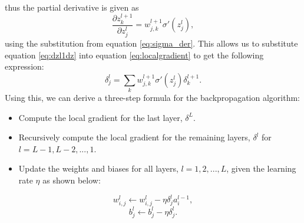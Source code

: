 thus the partial derivative is given as 
\begin{equation}
    \label{eq:dzl1dz}
    \frac{\partial z_k^{l+1}}{\partial z_j^l} = w_{j,k}^{l+1}\sigma'(z_j^l), 
\end{equation}
using the substitution from equation \ref{eq:sigma_der}. This allows us to substitute equation \ref{eq:dzl1dz} into equation \ref{eq:localgradient} to get the following expression:
\begin{equation}
    \label{eq:localgradient2}
    \delta_j^l = \sum_k w_{j,k}^{l+1}\sigma'(z_j^l)\delta_k^{l+1}.
\end{equation}
Using this, we can derive a three-step formula for the backpropagation algorithm:
\begin{itemize}
    \item Compute the local gradient for the last layer, $\delta^L$.
    \item Recursively compute the local gradient for the remaining layers, $\delta^l$ for $l=L-1, L-2, ..., 1$.
    \item Update the weights and biases for all layers, $l=1, 2, ..., L$, given the learning rate $\eta$ as shown below: 
\end{itemize}
\begin{equation*}
    w_{i,j}^{l} \leftarrow w_{i,j}^{l} - \eta \delta_j^l a_i^{l-1},
\end{equation*}
\begin{equation*}
    b_j^l \leftarrow b_j^l - \eta \delta_j^l.
\end{equation*}

